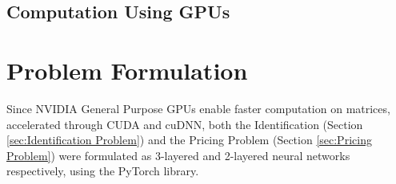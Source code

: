 \documentclass[12pt]{article}
\begin{document}
    \subsection{Computation Using GPUs} \label{sec:comp_using_GPUs}
    
    \section{Problem Formulation} \label{sec:Problem Formulation}
    Since NVIDIA General Purpose GPUs enable faster computation on matrices, accelerated through CUDA and cuDNN, both the Identification (Section \ref{sec:Identification Problem}) and the Pricing Problem (Section \ref{sec:Pricing Problem}) were formulated as 3-layered and 2-layered neural networks respectively, using the PyTorch library.
    
\end{document}
